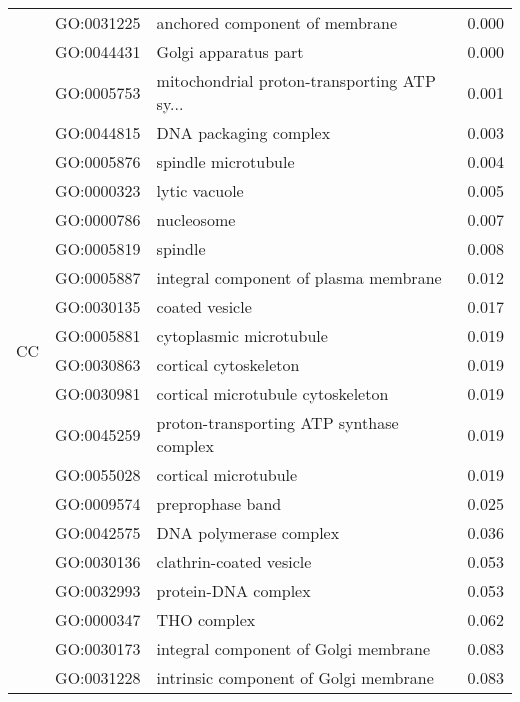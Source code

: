 \begin{longtable}{lllr}
\cline{1-4}
\multirow{24}{*}{CC} & GO:0031225 &               anchored component of membrane &         0.000 \\
   & GO:0044431 &                         Golgi apparatus part &         0.000 \\
   & GO:0005753 &  mitochondrial proton-transporting ATP sy... &         0.001 \\
   & GO:0044815 &                        DNA packaging complex &         0.003 \\
   & GO:0005876 &                          spindle microtubule &         0.004 \\
   & GO:0000323 &                                lytic vacuole &         0.005 \\
   & GO:0000786 &                                   nucleosome &         0.007 \\
   & GO:0005819 &                                      spindle &         0.008 \\
   & GO:0005887 &        integral component of plasma membrane &         0.012 \\
   & GO:0030135 &                               coated vesicle &         0.017 \\
   & GO:0005881 &                      cytoplasmic microtubule &         0.019 \\
   & GO:0030863 &                        cortical cytoskeleton &         0.019 \\
   & GO:0030981 &            cortical microtubule cytoskeleton &         0.019 \\
   & GO:0045259 &     proton-transporting ATP synthase complex &         0.019 \\
   & GO:0055028 &                         cortical microtubule &         0.019 \\
   & GO:0009574 &                             preprophase band &         0.025 \\
   & GO:0042575 &                       DNA polymerase complex &         0.036 \\
   & GO:0030136 &                      clathrin-coated vesicle &         0.053 \\
   & GO:0032993 &                          protein-DNA complex &         0.053 \\
   & GO:0000347 &                                  THO complex &         0.062 \\
   & GO:0030173 &         integral component of Golgi membrane &         0.083 \\
   & GO:0031228 &        intrinsic component of Golgi membrane &         0.083 \\

\end{longtable}
